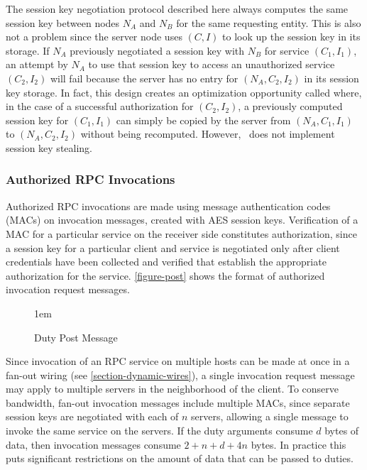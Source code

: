 The session key negotiation protocol described here always computes the same session key between
nodes $N_A$ and $N_B$ for the same requesting entity. This is also not a problem since the
server node uses $(C, I)$ to look up the session key in its storage. If $N_A$ previously
negotiated a session key with $N_B$ for service $(C_1, I_1)$, an attempt by $N_A$ to use that
session key to access an unauthorized service $(C_2, I_2)$ will fail because the server has no
entry for $(N_A, C_2, I_2)$ in its session key storage. In fact, this design creates an
optimization opportunity called  where, in the case of a
successful authorization for $(C_2, I_2)$, a previously computed session key for $(C_1, I_1)$
can simply be copied by the server from $(N_A, C_1, I_1)$ to $(N_A, C_2, I_2)$ without being
recomputed. However, \Sprocket\ does not implement session key stealing.

\subsubsection{Authorized RPC Invocations}

Authorized RPC invocations are made using message authentication codes (MACs) on invocation
messages, created with AES session keys. Verification of a MAC for a particular service on the
receiver side constitutes authorization, since a session key for a particular client and service
is negotiated only after client credentials have been collected and verified that establish the
appropriate authorization for the service. \autoref{figure-post} shows the format of authorized
invocation request messages.

\begin{figure}[t]
  
  \centerline{\raise 1em\box\graph}
  \caption{Duty Post Message}
  \label{figure-post}
\end{figure}

Since invocation of an RPC service on multiple hosts can be made at once in a fan-out wiring
(see \autoref{section-dynamic-wires}), a single invocation request message may apply to multiple
servers in the neighborhood of the client. To conserve bandwidth, fan-out invocation messages
include multiple MACs, since separate session keys are negotiated with each of $n$ servers,
allowing a single message to invoke the same service on the servers. If the duty arguments
consume $d$ bytes of data, then invocation messages consume $2 + n + d + 4n$ bytes. In practice
this puts significant restrictions on the amount of data that can be passed to duties.

